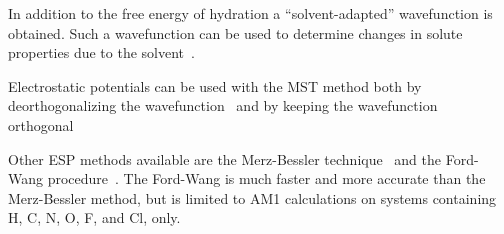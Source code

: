\begin{description}
In addition to the free energy of hydration a ``solvent-adapted'' wavefunction
is obtained. Such a wavefunction can be used to determine changes in
solute properties due to the solvent~\cite{lobg,lo,lo2,lobg2}.

Electrostatic potentials can be used with the MST method both by deorthogonalizing
the wavefunction~\cite{lio,alo,lo3} and by keeping the wavefunction
orthogonal~\cite{frr,alo2}

Other ESP methods available are the Merz-Bessler technique~\cite{esp} and
the Ford-Wang procedure~\cite{pmep1,pmep2}.  The Ford-Wang is much faster and
more accurate than the Merz-Bessler method, but is limited to AM1 calculations
on systems containing H, C, N, O, F, and Cl, only.
\end{description}
